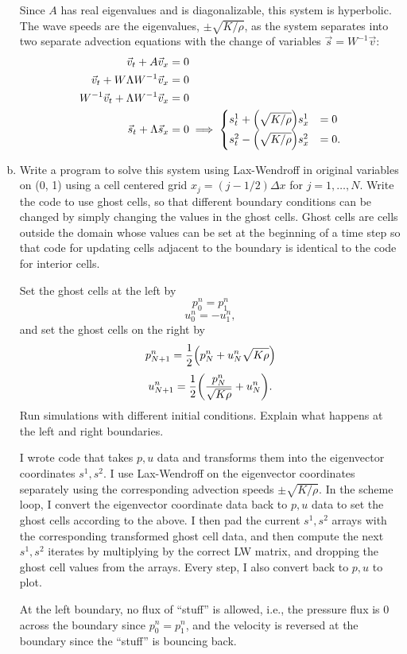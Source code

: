 \documentclass[12pt]{article}
\begin{document}
\begin{enumerate}[(a)]
Since $A$ has real eigenvalues and is diagonalizable, this system is hyperbolic.  The wave speeds are the eigenvalues, $\pm\sqrt{K/\rho}$, as the system separates into two separate advection equations with the change of variables $\vec{s} = W^{-1}\vec{v}:$
\begin{align*}
\vec{v}_t + A \vec{v}_x &= 0 \\
 \vec{v}_t + W\Lambda W^{-1} \vec{v}_x &= 0 \\
 W^{-1}\vec{v}_t + \Lambda W^{-1} \vec{v}_x &= 0 \\
\vec{s}_t + \Lambda \vec{s}_x &= 0 \implies
\begin{cases}
s^1_t + \qty(\sqrt{K/\rho}) s^1_x &= 0 \\ 
s^2_t - \qty(\sqrt{K/\rho})s^2_x &= 0.\end{cases}\end{align*}
\item Write a program to solve this system using Lax-Wendroff in original variables on (0, 1) using a cell centered grid $x_j = (j - 1/2)\Delta x $ for $j = 1,\dots, N$. Write the code to use ghost cells, so that different boundary conditions can be changed by simply changing the values in the ghost cells. Ghost cells are cells outside the domain whose values can be set at the beginning of a time step so that code for updating cells adjacent to the boundary is identical to the code for interior cells.

Set the ghost cells at the left by 
$$p_0^n = p_1^n $$
$$u_0^n = -u_1^n,$$
and set the ghost cells on the right by
$$p_{N+1}^n = \frac{1}{2}\qty(p_N^n + u_N^n \sqrt{K\rho})$$
$$u_{N+1}^n = \frac{1}{2} \qty(\dfrac{p_N^n}{\sqrt{K\rho}} + u_N^n). $$
Run simulations with different initial conditions. Explain what happens at the left and right boundaries.

I wrote code that takes $p,u$ data and transforms them into the eigenvector coordinates $s^1, s^2$.  I use Lax-Wendroff on the eigenvector coordinates separately using the corresponding advection speeds $\pm\sqrt{K/\rho}$.  In the scheme loop, I convert the eigenvector coordinate data back to $p,u$ data to set the ghost cells according to the above.  I then pad the current $s^1, s^2$ arrays with the corresponding transformed ghost cell data, and then compute the next $s^1, s^2$ iterates by multiplying by the correct LW matrix, and dropping the ghost cell values from the arrays.  Every step, I also convert back to $p,u$ to plot.

At the left boundary, no flux of ``stuff'' is allowed, i.e., the pressure flux is 0 across the boundary since $p_0^n = p_1^n$, and the velocity is reversed at the boundary since the ``stuff'' is bouncing back.


\end{enumerate}
\end{document}
